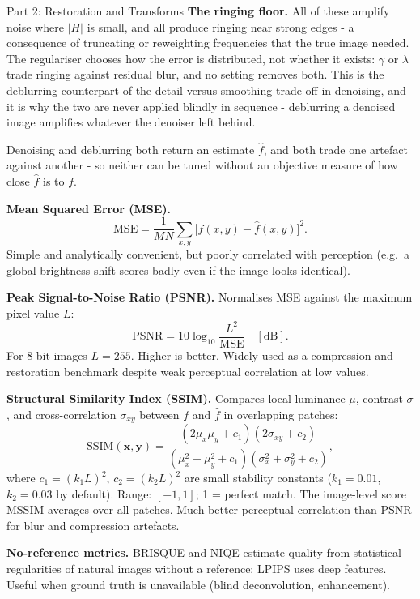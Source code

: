 \documentclass[letterpaper]{article}
\begin{document}
\begin{notes}{Part 2: Restoration and Transforms}
\textbf{The ringing floor.} All of these amplify noise where $|H|$ is small, and all produce ringing near strong edges - a consequence of truncating or reweighting frequencies that the true image needed. The regulariser chooses how the error is distributed, not whether it exists: $\gamma$ or $\lambda$ trade ringing against residual blur, and no setting removes both. This is the deblurring counterpart of the detail-versus-smoothing trade-off in denoising, and it is why the two are never applied blindly in sequence - deblurring a denoised image amplifies whatever the denoiser left behind.


Denoising and deblurring both return an estimate $\hat f$, and both trade one artefact against another - so neither can be tuned without an objective measure of how close $\hat f$ is to $f$.

\textbf{Mean Squared Error (MSE).}
$$\mathrm{MSE} = \frac{1}{MN}\sum_{x,y}\bigl[f(x,y)-\hat{f}(x,y)\bigr]^2.$$
Simple and analytically convenient, but poorly correlated with perception (e.g.\ a global brightness shift scores badly even if the image looks identical).

\textbf{Peak Signal-to-Noise Ratio (PSNR).} Normalises MSE against the maximum pixel value $L$:
$$\mathrm{PSNR} = 10\log_{10}\!\frac{L^2}{\mathrm{MSE}} \quad [\mathrm{dB}].$$
For 8-bit images $L=255$. Higher is better. Widely used as a compression and restoration benchmark despite weak perceptual correlation at low values.

\textbf{Structural Similarity Index (SSIM).} Compares local luminance $\mu$, contrast $\sigma$, and cross-correlation $\sigma_{xy}$ between $f$ and $\hat{f}$ in overlapping patches:
$$\mathrm{SSIM}(\mathbf{x},\mathbf{y}) = \frac{(2\mu_x\mu_y+c_1)(2\sigma_{xy}+c_2)}{(\mu_x^2+\mu_y^2+c_1)(\sigma_x^2+\sigma_y^2+c_2)},$$
where $c_1=(k_1 L)^2$, $c_2=(k_2 L)^2$ are small stability constants ($k_1{=}0.01$, $k_2{=}0.03$ by default). Range: $[-1,1]$; 1 = perfect match. The image-level score MSSIM averages over all patches. Much better perceptual correlation than PSNR for blur and compression artefacts.

\textbf{No-reference metrics.} BRISQUE and NIQE estimate quality from statistical regularities of natural images without a reference; LPIPS uses deep features. Useful when ground truth is unavailable (blind deconvolution, enhancement).

\columnbreaknofill


\end{notes}
\end{document}
